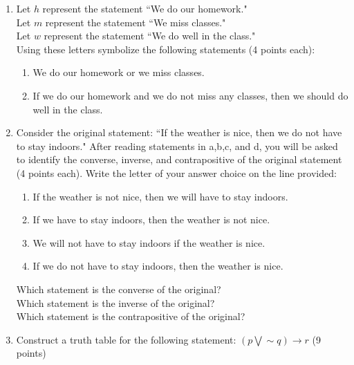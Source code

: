 \documentclass[12pt]{article}
\begin{document}
\begin{enumerate}
\item Let $h$ represent the statement ``We do our homework."
\\Let $m$ represent the statement ``We miss classes."
\\Let $w$ represent the statement ``We do well in the class."
\\Using these letters symbolize the following statements (4 points each):
\begin{enumerate}
\item We do our homework or we miss classes.
\vspace{.5 in}
\item If we do our homework and we do not miss any classes, then we should do well in the class.
\vspace{.5 in}
\end{enumerate}

\item Consider the original statement: ``If the weather is nice, then we do not have to stay indoors."  After reading statements in a,b,c, and d, you will be asked to identify the converse, inverse, and contrapositive of the original statement (4 points each).  Write the letter of your answer choice on the line provided:
\begin{enumerate}
\item If the weather is not nice, then we will have to stay indoors.
\item If we have to stay indoors, then the weather is not nice.
\item We will not have to stay indoors if the weather is nice.
\item If we do not have to stay indoors, then the weather is nice.
\end{enumerate}

Which statement is the converse of the original? \underline{\hspace{.5 in}}
\vspace{.2in}
\\Which statement is the inverse of the original? \underline{\hspace{.5 in}}
\vspace{.2 in}
\\Which statement is the contrapositive of the original? \underline{\hspace{.5 in}}

\newpage
\item Construct a truth table for the following statement: $( p\bigvee \sim q)\rightarrow r$ (9 points)


\end{enumerate}
\end{document}
